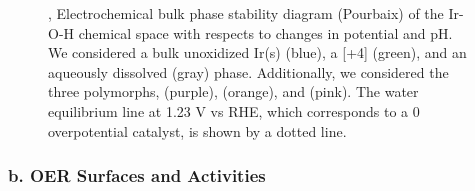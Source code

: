 \begin{figure}
\centering
{}
\caption{\label{fig:bulk_pourbaix},
Electrochemical bulk phase stability diagram (Pourbaix) of the Ir-O-H chemical space with respects to changes in potential and pH.
%
We considered a bulk unoxidized Ir(s) (blue), a [+4] \rIrOtwo  (green), and an aqueously dissolved  (gray) phase.
%
Additionally, we considered the three  polymorphs, \aIrOthree (purple), \rIrOthree (orange), and \bIrOthree (pink).
%
The water equilibrium line at 1.23 V vs RHE, which corresponds to a 0 overpotential catalyst, is shown by a dotted line.
}
\end{figure}




\subsubsection{b. OER Surfaces and Activities}

